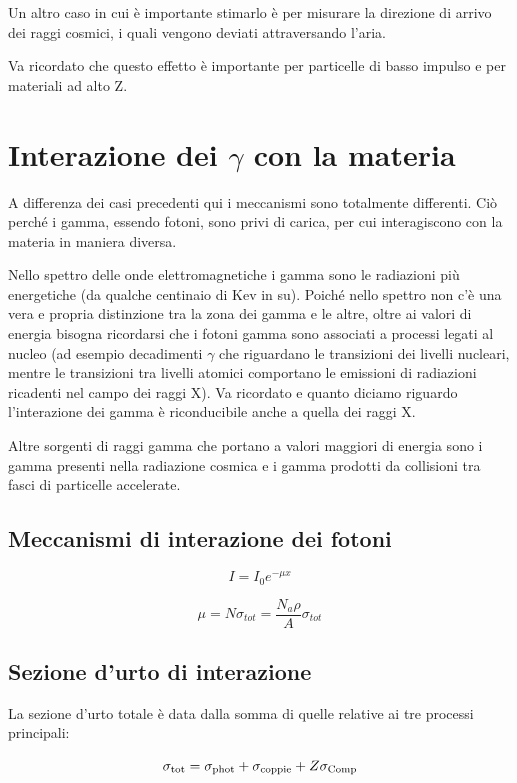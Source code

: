 Un altro caso in cui è importante stimarlo è per misurare la direzione di arrivo dei raggi cosmici, i quali vengono deviati attraversando l'aria.

Va ricordato che questo effetto è importante per particelle di basso impulso e per materiali ad alto Z.

\section{Interazione dei \texorpdfstring{$\gamma$}{\textgamma} con la materia}

A differenza dei casi precedenti qui i meccanismi sono totalmente differenti. Ciò perché i gamma, essendo fotoni, sono privi di carica, per cui interagiscono con la materia in maniera diversa.

Nello spettro delle onde elettromagnetiche i gamma sono le radiazioni più energetiche (da qualche centinaio di Kev in su). Poiché nello spettro non c'è una vera e propria distinzione tra la zona dei gamma e le altre, oltre ai valori di energia bisogna ricordarsi che i fotoni gamma sono associati a processi legati al nucleo (ad esempio decadimenti $\gamma$ che riguardano le transizioni dei livelli nucleari, mentre le transizioni tra livelli atomici comportano le emissioni di radiazioni ricadenti nel campo dei raggi X). Va ricordato e quanto diciamo riguardo l'interazione dei gamma è riconducibile anche a quella dei raggi X.

Altre sorgenti di raggi gamma che portano a valori maggiori di energia sono i gamma presenti nella radiazione cosmica e i gamma prodotti da collisioni tra fasci di particelle accelerate.

\subsection{Meccanismi di interazione dei fotoni}

$$I=I_0 e^{-\mu x}$$

$$\mu=N \sigma_{tot}
=\frac{N_a \rho}{A} \sigma_{tot}$$

\subsection{Sezione d'urto di interazione}

La sezione d'urto totale è data dalla somma di quelle relative ai tre processi principali:

$$\sigma_{\rm tot}=\sigma_{\rm phot} + \sigma_{\rm coppie} + Z \sigma_{\rm Comp}$$

